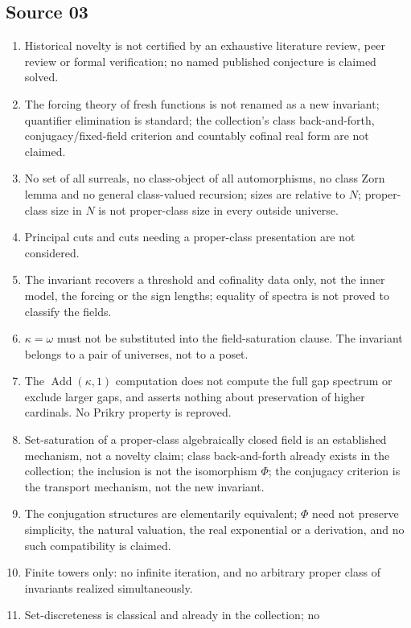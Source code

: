 \documentclass[11pt,letterpaper]{article}
\numberwithin{equation}{section}
\theoremstyle{definition}
\theoremstyle{remark}
\newcommand{\Add}{\operatorname{Add}}
\begin{document}
\subsection*{Source 03}
\begin{enumerate}[label=03.\arabic*,leftmargin=3.2em]
\item Historical novelty is not certified by an exhaustive literature review,
peer review or formal verification; no named published conjecture is claimed
solved.
\item The forcing theory of fresh functions is not renamed as a new invariant;
quantifier elimination is standard; the collection's class back-and-forth,
conjugacy/fixed-field criterion and countably cofinal real form are not
claimed.
\item No set of all surreals, no class-object of all automorphisms, no class
Zorn lemma and no general class-valued recursion; sizes are relative to $N$;
proper-class size in $N$ is not proper-class size in every outside universe.
\item Principal cuts and cuts needing a proper-class presentation are not
considered.
\item The invariant recovers a threshold and cofinality data only, not the
inner model, the forcing or the sign lengths; equality of spectra is not proved
to classify the fields.
\item $\kappa=\omega$ must not be substituted into the field-saturation clause.
The invariant belongs to a pair of universes, not to a poset.
\item The $\Add(\kappa,1)$ computation does not compute the full gap spectrum or
exclude larger gaps, and asserts nothing about preservation of higher cardinals.
No Prikry property is reproved.
\item Set-saturation of a proper-class algebraically closed field is an
established mechanism, not a novelty claim; class back-and-forth already exists
in the collection; the inclusion is not the isomorphism $\Phi$; the conjugacy
criterion is the transport mechanism, not the new invariant.
\item The conjugation structures are elementarily equivalent; $\Phi$ need not
preserve simplicity, the natural valuation, the real exponential or a
derivation, and no such compatibility is claimed.
\item Finite towers only: no infinite iteration, and no arbitrary proper class of
invariants realized simultaneously.
\item Set-discreteness is classical and already in the collection; no

\end{enumerate}
\end{document}
